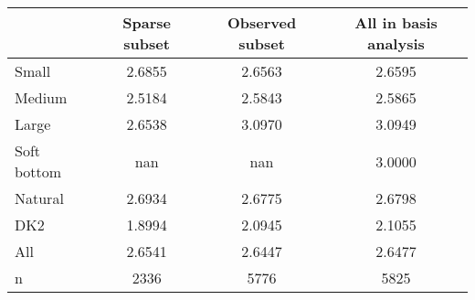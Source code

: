 \begin{tabular}{lccc}
\toprule
 & Sparse subset & Observed subset & All in basis analysis \\
\midrule
Small & 2.6855 & 2.6563 & 2.6595 \\
Medium & 2.5184 & 2.5843 & 2.5865 \\
Large & 2.6538 & 3.0970 & 3.0949 \\
Soft bottom & nan & nan & 3.0000 \\
Natural & 2.6934 & 2.6775 & 2.6798 \\
DK2 & 1.8994 & 2.0945 & 2.1055 \\
All & 2.6541 & 2.6447 & 2.6477 \\
n & 2336 & 5776 & 5825 \\
\bottomrule
\end{tabular}
